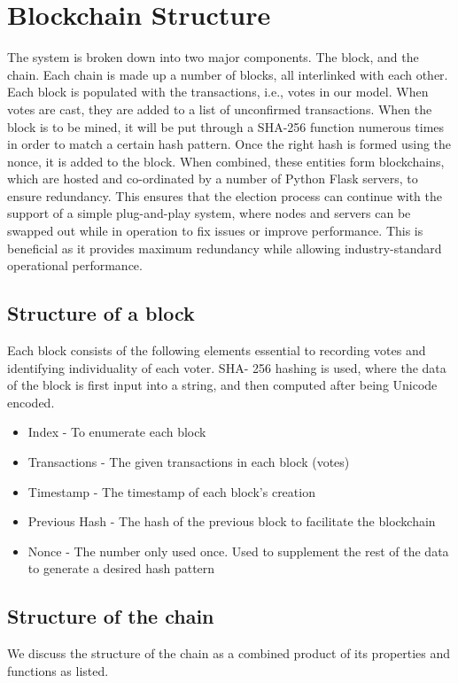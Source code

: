 \documentclass{article}
\begin{document}
    \section{Blockchain Structure}
    The system is broken down into two major components. The block, and the chain. Each chain is made up a number of blocks, all interlinked with each other. Each block is populated with the transactions, i.e., votes in our model.
    When votes are cast, they are added to a list of unconfirmed transactions. When the block is to be mined, it will be put through a SHA-256 function numerous times in order to match a certain hash pattern. Once the right hash is formed using the nonce, it is added to the block.
    When combined, these entities form blockchains, which are hosted and co-ordinated by a number of Python Flask servers, to ensure redundancy. This ensures that the election process can continue with the support of a simple plug-and-play system, where nodes and servers can be swapped out while in operation to fix issues or improve performance. This is beneficial as it provides maximum redundancy while allowing industry-standard operational performance.
    \subsection{Structure of a block}
    Each block consists of the following elements essential to recording votes and identifying individuality of each voter. SHA- 256 hashing is used, where the data of the block is first input into a string, and then computed after being Unicode encoded.
    \begin{itemize}
        \item Index - To enumerate each block
        \item Transactions - The given transactions in each block (votes)
        \item Timestamp - The timestamp of each block's creation
        \item Previous Hash - The hash of the previous block to facilitate the blockchain
        \item Nonce - The number only used once. Used to supplement the rest of the data to generate a desired hash pattern
    \end{itemize}
    \subsection{Structure of the chain}
    We discuss the structure of the chain as a combined product of its properties and functions as listed.
\end{document}
